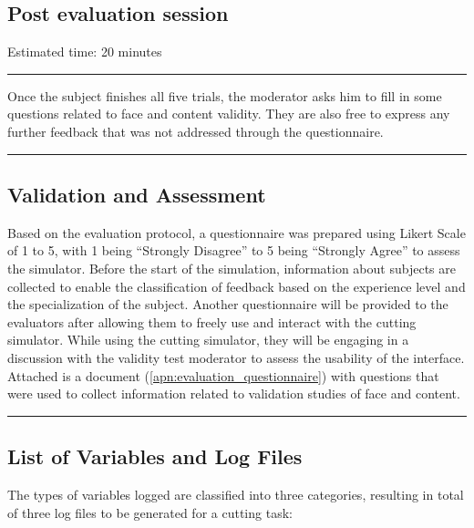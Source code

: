 \subsection{Post evaluation session}
Estimated time: 20 minutes\\[-2ex]
\hrule%
Once the subject finishes all five trials, the moderator asks him to fill in some questions related to face and content validity. They are also free to express any further feedback that was not addressed through the questionnaire.

\hrule%

\subsection{Validation and Assessment}

Based on the evaluation protocol, a questionnaire was prepared using Likert Scale of 1 to 5, with 1 being \enquote{Strongly Disagree} to 5 being \enquote{Strongly Agree} to assess the simulator. Before the start of the simulation, information about subjects are collected to enable the classification of feedback based on the experience level and the specialization of the subject. Another questionnaire will be provided to the evaluators after allowing them to freely use and interact with the cutting simulator. While using the cutting simulator, they will be engaging in a discussion with the validity test moderator to assess the usability of the interface. Attached is a document (\autoref{apn:evaluation_questionnaire}) with questions that were used to collect information related to validation studies of face and content.



\hrule%

\label{part:}


\subsection{List of Variables and Log Files}

The types of variables logged are classified into three categories, resulting in  total of three log files to be generated for a cutting task:

